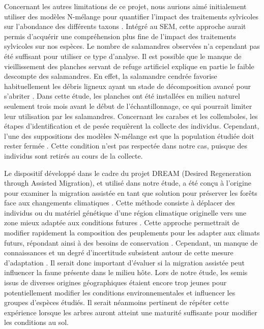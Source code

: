 Concernant les autres limitations de ce projet, nous aurions aimé initialement utiliser des modèles N-mélange pour quantifier l'impact des traitements sylvicoles sur l'abondance des différents taxons \citep{royleNmixtureModelsEstimating2004,Mazerolle2021Woodlandsalamander}.
Intégré au SEM, cette approche aurait permis d'acquérir une compréhension plus fine de l'impact des traitements sylvicoles sur nos espèces. 
Le nombre de salamandres observées n'a cependant pas été suffisant pour utiliser ce type d'analyse. 
Il est possible que le manque de vieillissement des planches servant de refuge artificiel explique en partie le faible descompte des salamandres. 
En effet, la salamandre cendrée favorise habituellement les débris ligneux ayant un stade de décomposition avancé pour s'abriter \citep{Hedrick2021Effectscoverboard}. 
Dans cette étude, les planches ont été installées en milieu naturel seulement trois mois avant le début de l'échantillonnage, ce qui pourrait limiter leur utilisation par les salamandres. 
Concernant les carabes et les collemboles, les étapes d’identification et de pesée requièrent la collecte des individus.  
Cependant, l’une des suppositions des modèles N-mélange est que la population étudiée doit rester fermée \citep{royleNmixtureModelsEstimating2004}.  
Cette condition n’est pas respectée dans notre cas, puisque des individus sont retirés au cours de la collecte.


Le dispositif développé dans le cadre du projet DREAM (Desired Regeneration through Assisted Migration), et utilisé dans notre étude, a été conçu à l'origine pour examiner la migration assistée en tant que solution pour préserver les forêts face aux changements climatiques \citep{royoDesiredREgenerationAssisted2023}.
Cette méthode consiste à déplacer des individus ou du matériel génétique d’une région climatique originelle vers une zone mieux adaptée aux conditions futures \citep{Vitt2010Assistedmigration}. 
Cette approche permettrait de modifier rapidement la composition des peuplements pour les adapter aux climats futurs, répondant ainsi à des besoins de conservation \citep{Dumroese2015Considerationsrestoring,Park2018Informationunderload,Park2023Provenancetrials}. 
Cependant, un manque de connaissances et un degré d’incertitude subsistent autour de cette mesure d’adaptation \citep{Klenk2015assistedmigration,Park2018Informationunderload}. 
Il serait donc important d’évaluer si la migration assistée peut influencer la faune présente dans le milieu hôte.
Lors de notre étude, les semis issus de diverses origines géographiques étaient encore trop jeunes pour potentiellement modifier les conditions environnementales et influencer les groupes d’espèces étudiés.
Il serait néanmoins pertinent de répéter cette expérience lorsque les arbres auront atteint une maturité suffisante pour modifier les conditions au sol.

